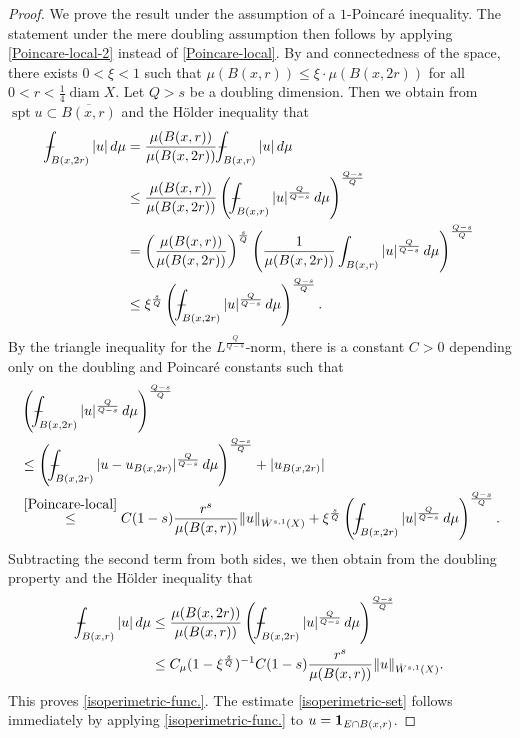 \documentclass[11pt,leqno]{amsart}
\def\Xint#1{\mathchoice
	{\XXint\displaystyle\textstyle{#1}}
	{\XXint\textstyle\scriptstyle{#1}}
	{\XXint\scriptstyle\scriptscriptstyle{#1}}
	{\XXint\scriptscriptstyle\scriptscriptstyle{#1}}
	\!\int}
\def\XXint#1#2#3{{\setbox0=\hbox{$#1{#2#3}{\int}$ }
		\vcenter{\hbox{$#2#3$ }}\kern-.6\wd0}}
\def\dashint{\Xint-}
\numberwithin{equation}{section}
\theoremstyle{definition}
\DeclareMathOperator{\diam}{diam}
\DeclareMathOperator{\supp}{spt}
\begin{document}
	\begin{proof}
		We prove the result under the assumption of a $1$-Poincar\'e inequality.
		The statement under the mere doubling assumption then follows by applying \eqref{Poincare-local-2}
		instead of \eqref{Poincare-local}.
		By \cite[Lemma~3.7]{BB11} and connectedness of the space,
		there exists $0<\xi<1$ such that 
		$\mu(B(x,r))\leq \xi \cdot \mu(B(x,2r))$ for all $0<r<\frac{1}{4}\diam X$. Let $Q>s$ be a doubling dimension. Then we obtain from
		$\supp u \subset \overline{B(x,r)}$ and the H\"older inequality that
		\begin{align*}
			\dashint_{B(x,2r)}|u|\,d\mu
			&=\frac{\mu(B(x,r))}{\mu(B(x,2r))}\dashint_{B(x,r)}|u|\,d\mu\\
			&\leq \frac{\mu(B(x,r))}{\mu(B(x,2r))} \left(\dashint_{B(x,r)} |u|^{\frac{Q}{Q-s}}\,d\mu \right)^{\frac{Q-s}{Q}}\\
			&= \left(\frac{\mu(B(x,r))}{\mu(B(x,2r))} \right)^{\frac{s}{Q}} \left(\frac{1}{\mu(B(x,2r))}\int_{B(x,r)} |u|^{\frac{Q}{Q-s}}\,d\mu \right)^{\frac{Q-s}{Q}}\\
			&\leq \xi^{\frac{s}{Q}}\left(\dashint _{B(x,2r)}|u|^{\frac{Q}{Q-s}}\,d\mu \right)^{\frac{Q-s}{Q}}.
		\end{align*}
		By the triangle inequality for the $L^{\frac{Q}{Q-s}}$-norm,
		there is a constant $C>0$ depending only on the doubling and Poincar\'e constants such that
		\begin{align*}
			&\left(\dashint_{B(x,2r)} |u|^{\frac{Q}{Q-s}}\,d\mu \right)^{\frac{Q-s}{Q}}\\
			&\leq \left(\dashint_{B(x,2r)} |u-u_{B(x,2r)}|^{\frac{Q}{Q-s}}\,d\mu \right)^{\frac{Q-s}{Q}} +|u_{B(x,2r)}|\\
			&\overset{\eqref{Poincare-local}}{\le} C(1-s)\frac{r^s}{\mu(B(x, r))}\|u\|_{\dot W^{s,1}(X)}+ \xi^{\frac{s}{Q}}\left(\dashint _{B(x,2r)}|u|^{\frac{Q}{Q-s}}\,d\mu \right)^{\frac{Q-s}{Q}}.
		\end{align*}
		Subtracting the second term from both sides, we then obtain from the doubling property and the H\"older inequality that
		\begin{align*}
			\dashint_{B(x,r)}|u|\,d\mu
			&\leq \frac{\mu(B(x,2r))}{\mu(B(x,r))} \left(\dashint_{B(x,2r)} |u|^{\frac{Q}{Q-s}}\,d\mu \right)^{\frac{Q-s}{Q}}\\
			&\leq C_\mu (1-\xi^{\frac{s}{Q}})^{-1} C(1-s)\frac{r^s}{\mu(B(x,r))}\|u\|_{\dot W^{s,1}(X)}.
		\end{align*}
		This proves \eqref{isoperimetric-func.}. The estimate \eqref{isoperimetric-set} follows immediately by applying \eqref{isoperimetric-func.} to $u={\bf 1}_{E\cap B(x,r)}$.
	\end{proof}
	
\end{document}

